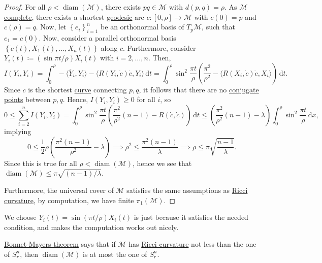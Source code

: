 \begin{proof}
	For all \(\rho < \mathop{\mathrm{diam}}(\mathcal{M} ) \), there exists \(p q\in \mathcal{M} \) with \(d(p, q) = \rho \). As \(\mathcal{M} \) \hyperref[def:geodesically-complete]{complete}, there exists a shortest \hyperref[def:geodesic]{geodesic} arc \(c \colon [0, \rho ] \to \mathcal{M} \) with \(c(0) = p\) and \(c(\rho ) = q\). Now, let \(\left\{ e_i \right\} _{i=1}^n\) be an orthonormal basis of \(T_p \mathcal{M} \), such that \(e_1 = \dot{c} (0)\). Now, consider a parallel orthonormal basis \(\left\{ \dot{c} (t), X_1(t), \ldots , X_n(t) \right\} \)  along \(c\). Furthermore, consider \(Y_i(t) \coloneqq (\sin \pi t / \rho )X_i (t)\) with \(i = 2, \ldots , n\). Then,
	\[
		I(Y_i, Y_i)
		= \int_{0}^{\rho } - \langle \ddot{Y_i} , Y_i \rangle - \langle R(Y_i, \dot{c})\dot{c} , Y_i \rangle  \,\mathrm{d}t
		= \int_{0}^{\rho } \sin ^2 \frac{\pi t}{\rho } \left( \frac{\pi ^2}{\rho ^2} - \langle R(X_i, \dot{c} )\dot{c}, X_i  \rangle \right)  \,\mathrm{d}t.
	\]
	Since \(c\) is the shortest \hyperref[def:curve]{curve} connecting \(p, q\), it follows that there are no \hyperref[def:conjugate-point]{conjugate points} between \(p, q\). Hence, \(I(Y_i, Y_i) \geq 0\) for all \(i\), so
	\[
		0
		\leq \sum_{i=2}^{n} I(Y_i, Y_i)
		= \int_{0}^{\rho} \sin ^2 \frac{\pi t}{\rho } \left( \frac{\pi ^2}{\rho ^2} (n-1) - R(\dot{c} , \dot{c} ) \right) \,\mathrm{d}t
		\leq \left( \frac{\pi ^2}{\rho ^2}(n-1) - \lambda \right) \int_{0}^{\rho } \sin ^2 \frac{\pi t}{\rho } \,\mathrm{d}x,
	\]
	implying
	\[
		0 \leq \frac{1}{2} \rho \left( \frac{\pi ^2(n-1)}{\rho ^2} - \lambda  \right)
		\implies \rho ^2 \leq \frac{\pi ^2 (n-1)}{\lambda }
		\implies \rho \leq \pi \sqrt{\frac{n-1}{\lambda }}.
	\]
	Since this is true for all \(\rho < \mathop{\mathrm{diam}}(\mathcal{M} ) \), hence we see that \(\mathop{\mathrm{diam}}(\mathcal{M} ) \leq \pi \sqrt{(n-1) / \lambda } \).

	Furthermore, the universal cover of \(\mathcal{M} \) satisfies the same assumptions as \hyperref[def:Ricci-curvature]{Ricci curvature}, by computation, we have finite \(\pi _1(\mathcal{M} )\).
\end{proof}

\begin{remark}
	We choose \(Y_i(t) = \sin (\pi t / \rho ) X_i(t)\) is just because it satisfies the needed condition, and makes the computation works out nicely.
\end{remark}

\begin{intuition}
	\hyperref[thm:Bonnet-Mayers]{Bonnet-Mayers theorem} says that if \(\mathcal{M} \) has \hyperref[def:Ricci-curvature]{Ricci curvature} not less than the one of \(S^n_r\), then \(\mathop{\mathrm{diam}}(\mathcal{M} ) \) is at most the one of \(S^n_r\).
\end{intuition}


